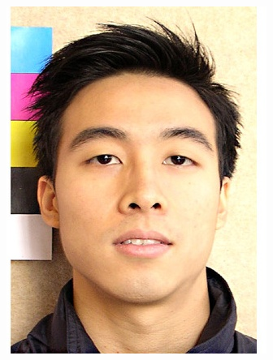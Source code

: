 \begin{figure}[htp]
	\centering
	\begin{subfigure}{0.2\linewidth}
		\includegraphics[width=\linewidth]{imagenes/dataset1-1.jpg} 
		\caption{}
		\label{fig:1a}
	\end{subfigure}\hfill
	\begin{subfigure}{0.2\linewidth}

\end{subfigure}
\end{figure}
